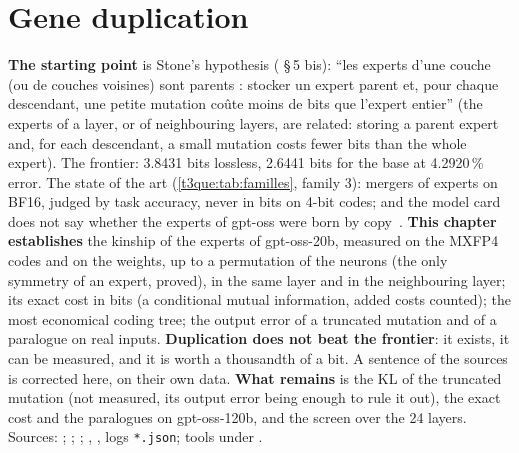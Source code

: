 \chapter{Gene duplication}\label{t3dup:ch}

\begin{origine}
\textbf{The starting point} is Stone's hypothesis ( §\,5 bis): ``les experts d'une couche (ou de couches voisines) sont parents : stocker un expert parent et, pour chaque descendant, une petite mutation coûte moins de bits que l'expert entier'' (the experts of a layer, or of neighbouring layers, are related: storing a parent expert and, for each descendant, a small mutation costs fewer bits than the whole expert). The frontier: 3.8431 bits lossless, 2.6441 bits for the base at 4.2920\,\% error. The state of the art (\cref{t3que:tab:familles}, family 3): mergers of experts on BF16, judged by task accuracy, never in bits on 4-bit codes; and the model card does not say whether the experts of gpt-oss were born by copy~\cite{openai2025gptoss}.
\textbf{This chapter establishes} the kinship of the experts of gpt-oss-20b, measured on the MXFP4 codes and on the weights, up to a permutation of the neurons (the only symmetry of an expert, proved), in the same layer and in the neighbouring layer; its exact cost in bits (a conditional mutual information, added costs counted); the most economical coding tree; the output error of a truncated mutation and of a paralogue on real inputs. \textbf{Duplication does not beat the frontier}: it exists, it can be measured, and it is worth a thousandth of a bit. A sentence of the sources is corrected here, on their own data.
\textbf{What remains} is the KL of the truncated mutation (not measured, its output error being enough to rule it out), the exact cost and the paralogues on gpt-oss-120b, and the screen over the 24 layers.
Sources: ; ; ; , , logs \texttt{*.json}; tools under .
\end{origine}

